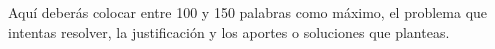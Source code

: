 \begin{resumen}
Aquí deberás colocar entre 100 y 150 palabras como
máximo, el problema que intentas resolver, la
justificación y los aportes o soluciones que planteas.
\end{resumen}
